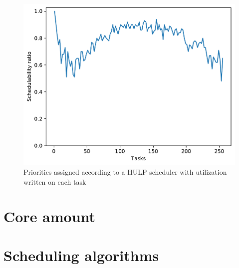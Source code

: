 \documentclass{kththesis}
\begin{document}
\begin{figure}

    \centering

    \includegraphics[width=1.0\linewidth]{images/task_amount_1.pdf}

    \caption{Priorities assigned according to a HULP scheduler with utilization written on each task}

    \label{fig:task_amount_1}

\end{figure}

\section{Core amount}

\section{Scheduling algorithms}
\end{document}
